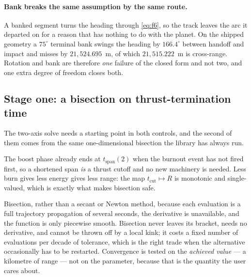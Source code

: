 \documentclass[11pt]{article}
\begin{document}
\paragraph{Bank breaks the same assumption by the same route.} A banked
segment turns the heading through \eqref{eq:f6}, so the track leaves the arc
it departed on for a reason that has nothing to do with the planet. On the
shipped geometry a $75^{\circ}$ terminal bank swings the heading by
$166.4^{\circ}$ between handoff and impact and misses by $21{,}524.695$~m, of
which $21{,}515.222$~m is cross-range. Rotation and bank are therefore
\emph{one} failure of the closed form and not two, and one extra degree of
freedom closes both.

\subsection{Stage one: a bisection on thrust-termination time}
\label{sec:rangesolve}

The two-axis solve needs a starting point in both controls, and the second of
them comes from the same one-dimensional bisection the library has always run.

The boost phase already ends at $t_{\text{span}}(2)$ when the burnout event has
not fired first, so a shortened span \emph{is} a thrust cutoff and no new
machinery is needed. Less burn gives less energy gives less range: the map
$t_{\text{cut}} \mapsto R$ is monotonic and single-valued, which is exactly
what makes bisection safe.

Bisection, rather than a secant or Newton method, because each evaluation is a
full trajectory propagation of several seconds, the derivative is unavailable,
and the function is only piecewise smooth. Bisection never leaves its bracket,
needs no derivative, and cannot be thrown off by a local kink; it costs a fixed
number of evaluations per decade of tolerance, which is the right trade when
the alternative occasionally has to be restarted. Convergence is tested on the
\emph{achieved value} --- a kilometre of range --- not on the parameter, because
that is the quantity the user cares about.
\end{document}
